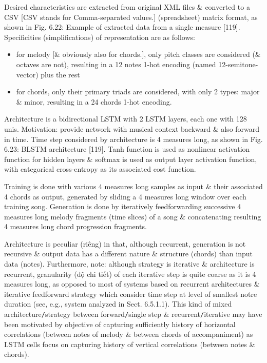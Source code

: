 \documentclass{article}
\begin{document}
\begin{itemize}
\begin{itemize}
\begin{itemize}
			Desired characteristics are extracted from original XML files \& converted to a CSV [CSV stands for Comma-separated values.] (spreadsheet) matrix format, as shown in {\sf Fig. 6.22: Example of extracted data from a single measure [119].} Specificities (simplifications) of representation are as follows:
			\begin{itemize}
				\item for melody [\& obviously also for chords.], only pitch classes are considered (\& octaves are not), resulting in a 12 notes 1-hot encoding (named 12-semitone-vector) plus the rest
				\item for chords, only their primary triads are considered, with only 2 types: major \& minor, resulting in a 24 chords 1-hot encoding.
			\end{itemize}
			Architecture is a bidirectional LSTM with 2 LSTM layers, each one with 128 unis. Motivation: provide network with musical context backward \& also forward in time. Time step considered by architecture is 4 measures long, as shown in {\sf Fig. 6.23: BLSTM architecture [119]}. Tanh function is used as nonlinear activation function for hidden layers \& softmax is used as output layer activation function, with categorical cross-entropy as its associated cost function.

			Training is done with various 4 measures long samples as input \& their associated 4 chords as output, generated by sliding a 4 measures long window over each training song. Generation is done by iteratively feedforwarding successive 4 measures long melody fragments (time slices) of a song \& concatenating resulting 4 measures long chord progression fragments.

			Architecture is peculiar (riêng) in that, although recurrent, generation is not recursive \& output data has a different nature \& structure (chords) than input data (notes). Furthermore, note: although strategy is iterative \& architecture is recurrent, granularity (độ chi tiết) of each iterative step is quite coarse as it is 4 measures long, as opposed to most of systems based on recurrent architectures \& iterative feedforward strategy which consider time step at level of smallest notre duration (see, e.g., system analyzed in Sect. 6.5.1.1). This kind of mixed architecture{\tt/}strategy between forward{\tt/}single step \& recurrent{\tt/}iterative may have been motivated by objective of capturing sufficiently history of horizontal correlations (between notes of melody \& between chords of accompaniment) as LSTM cells focus on capturing history of vertical correlations (between notes \& chords).


\end{itemize}
\end{itemize}
\end{itemize}
\end{document}
